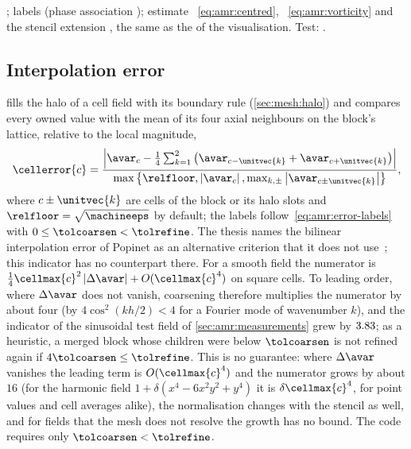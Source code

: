 \begin{implnote}
;
labels 
(phase association
);
estimate ~\cref{eq:amr:centred},
~\cref{eq:amr:vorticity}
and the stencil extension
, the same
as the  of the visualisation. Test:
.
\end{implnote}

\subsection{Interpolation error}\label{sec:amr:interpolation}
 fills the halo of a cell field with its
boundary rule (\cref{sec:mesh:halo}) and compares every owned value with the
mean of its four axial neighbours on the block's lattice, relative to the
local magnitude,
\begin{equation}\label{eq:amr:interpolation}
  \cellerror{c}=\frac{\abs{\avar_c-\frac14\sum_{k=1}^{2}\roundpar{\avar_{c-\unitvec{k}}+\avar_{c+\unitvec{k}}}}}
    {\max\curlypar{\relfloor,\abs{\avar_c},\max_{k,\pm}\abs{\avar_{c\pm\unitvec{k}}}}},
\end{equation}
where $c\pm\unitvec{k}$ are cells of the block or its halo slots and
$\relfloor=\sqrt{\machineeps}$ by default; the labels
follow~\cref{eq:amr:error-labels} with $0\le\tolcoarsen<\tolrefine$. The thesis
names the bilinear interpolation error of Popinet as an alternative criterion
that it does not use~; this indicator has no counterpart there.
For a smooth field the numerator is
$\tfrac14\cellmax{c}^2\abs{\Delta\avar}+O(\cellmax{c}^4)$ on square cells. To
leading order, where $\Delta\avar$ does not vanish, coarsening therefore
multiplies the numerator by about four (by $4\cos^2(kh/2)<4$ for a Fourier mode
of wavenumber $k$), and the indicator of the sinusoidal test field of
\cref{sec:amr:measurements} grew by $3.83$; as a heuristic, a
merged block whose children were below $\tolcoarsen$ is not refined again if
$4\tolcoarsen\le\tolrefine$. This is no guarantee: where $\Delta\avar$
vanishes the leading term is $O(\cellmax{c}^4)$ and the numerator grows by
about $16$ (for the harmonic field $1+\delta(x^4-6x^2y^2+y^4)$ it is
$\delta\cellmax{c}^4$, for point values and cell averages alike), the
normalisation changes with the stencil as well, and for fields that the mesh
does not resolve the growth has no bound. The code requires only
$\tolcoarsen<\tolrefine$.

